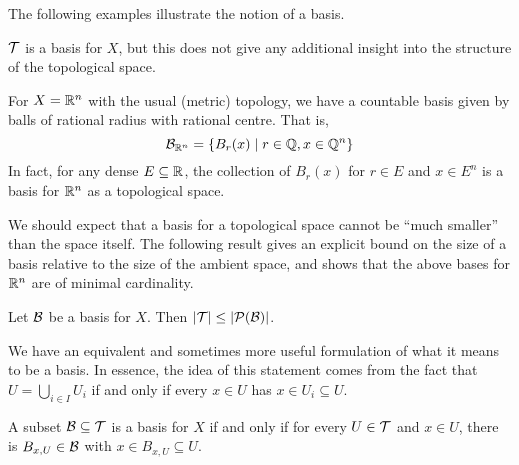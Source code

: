 \documentclass[11pt]{article}
\begin{document}
The following examples illustrate the notion of a basis.
\begin{example}
    \begin{enum2}
    \item $\mathcal{T}$ is a basis for $X$, but this does not give any additional insight into the structure of the topological space.
    \item For $X = \mathbb{R}^n$ with the usual (metric) topology, we have a countable basis given by balls of rational radius with rational centre. That is,
    $$
        \mathcal{B}_{\mathbb{R}^n} = \left\{  B_r(x) \mid r \in \mathbb{Q}, x \in \mathbb{Q}^n  \right\}
    $$
    In fact, for any dense $E \subseteq \mathbb{R}$, the collection of $B_r(x)$ for $r \in E$ and $x \in E^n$ is a basis for $\mathbb{R}^n$ as a topological space.
    \end{enum2}
\end{example}
We should expect that a basis for a topological space cannot be ``much smaller'' than the space itself. The following result gives an explicit bound on the size of a basis relative to the size of the ambient space, and shows that the above bases for $\mathbb{R}^n$ are of minimal cardinality.
\begin{proposition}
    Let $\mathcal{B}$ be a basis for $X$. Then $\left| \mathcal{T} \right| \leq \left| \mathcal{P}(\mathcal{B}) \right|$.
\end{proposition}
We have an equivalent and sometimes more useful formulation of what it means to be a basis. In essence, the idea of this statement comes from the fact that $U = \bigcup_{i \in I} U_i$ if and only if every $x \in U$ has $x \in U_i \subseteq U$.
\begin{lemma}
    A subset $\mathcal{B} \subseteq \mathcal{T}$ is a basis for $X$ if and only if for every $U \in \mathcal{T}$ and $x \in U$, there is $B_{x, U} \in \mathcal{B}$ with $x \in B_{x, U} \subseteq U$.
\end{lemma}
\end{document}
